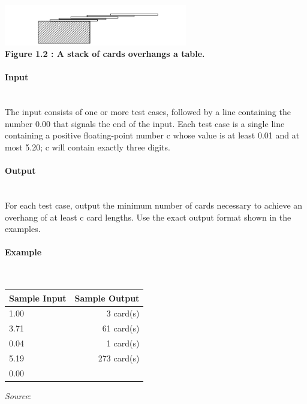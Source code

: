 \documentclass{article}
\begin{document}
\begin{center}
    \includegraphics[width=0.6\textwidth]{Figures/04.png} \\
    \textbf{Figure 1.2 : A stack of cards overhangs a table.}
\end{center}

\paragraph{Input} \mbox{} \\
The input consists of one or more test cases, followed by a line containing the number 0.00 that
signals the end of the input. Each test case is a single line containing a positive floating-point number c whose value is at least 0.01 and at most 5.20; c will contain exactly three digits.

\paragraph{Output}\mbox{} \\
For each test case, output the minimum number of cards necessary to achieve an overhang of at
least c card lengths. Use the exact output format shown in the examples.

\paragraph{Example}\mbox{} \\

\begin{table}[h]
    \centering
    \begin{tabular}{|l|r|}
        \hline
        \textbf{Sample Input} & \textbf{Sample Output} \\
        \hline
         1.00  & 3 card(s)  \\ 
         3.71  & 61 card(s) \\ 
         0.04  & 1 card(s) \\ 
         5.19  & 273 card(s) \\ 
         0.00 & \\ \hline
    \end{tabular}
\end{table}

\textit{Source}: 
\end{document}
